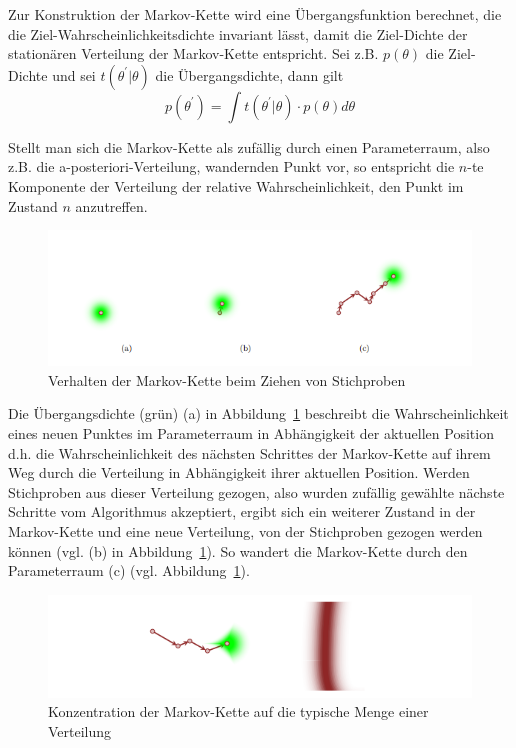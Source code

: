\documentclass[ngerman]{ttlab-qualify}
\begin{document}
Zur Konstruktion der Markov-Kette wird eine Übergangsfunktion berechnet, die die Ziel-Wahrscheinlichkeitsdichte invariant lässt, damit die Ziel-Dichte der stationären Verteilung der Markov-Kette entspricht. 
Sei z.B. $p(\theta)$ die Ziel-Dichte und sei $t(\theta^{'}|\theta)$ die Übergangsdichte, dann gilt
\[p(\theta^{'}) =\int t(\theta^{'}|\theta)\cdot p(\theta) d\theta \]

Stellt man sich die Markov-Kette als zufällig durch einen Parameterraum, also z.B. die a-posteriori-Verteilung, wandernden Punkt vor, so entspricht die $n$-te Komponente der Verteilung der relative Wahrscheinlichkeit, den Punkt im Zustand $n$ anzutreffen. 
\begin{figure}[]
\begin{center}
\includegraphics[scale=.9]{images/markov-chain-plain-betancourt-2017}
\caption{Verhalten der Markov-Kette beim Ziehen von Stichproben \parencite{betancourt:2017}}
\label{fig:markov-chain-plain}
\end{center}
\end{figure}

Die Übergangsdichte (grün) (a) in Abbildung~\ref{fig:markov-chain-plain} beschreibt die Wahrscheinlichkeit eines neuen Punktes im Parameterraum in Abhängigkeit der aktuellen Position d.h. die Wahrscheinlichkeit des nächsten Schrittes der Markov-Kette auf ihrem Weg durch die Verteilung in Abhängigkeit ihrer aktuellen Position.  Werden Stichproben aus dieser Verteilung gezogen, also wurden zufällig gewählte nächste Schritte vom Algorithmus akzeptiert, ergibt sich ein weiterer Zustand in der Markov-Kette und eine neue Verteilung, von der Stichproben gezogen werden können (vgl. (b) in Abbildung~\ref{fig:markov-chain-plain}). So wandert die Markov-Kette durch den Parameterraum (c) (vgl. Abbildung~\ref{fig:markov-chain-plain}).

\begin{figure}[H]
\begin{center}
\includegraphics[scale=.9]{images/markov-chain-target-betancourt-2017}
\caption{Konzentration der Markov-Kette auf die typische Menge einer Verteilung \parencite{betancourt:2017}}
\label{fig:markov-chain-target}
\end{center}
\end{figure}
\end{document}
